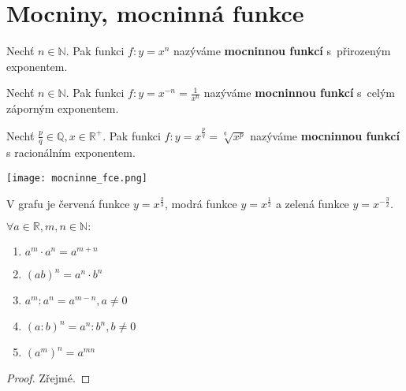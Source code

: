 \section{Mocniny, mocninná funkce}
\begin{minipage}{0.65\textwidth}
\begin{definition}
    Nechť $n\in \mathbb N.$ Pak funkci $f: y=x^n$ nazýváme \textbf{mocninnou funkcí}
    s~přirozeným exponentem.
\end{definition}

\begin{definition}
    Nechť $n\in \mathbb N.$ Pak funkci $f: y=x^{-n}=\frac{1}{x^n}$ nazýváme
    \textbf{mocninnou funkcí} s~celým záporným exponentem.
\end{definition}

\begin{definition}
    Nechť $\frac{p}{q}\in \mathbb Q, x \in \mathbb R^+.$ Pak funkci $f: y=
    x^{\frac{p}{q}}=\sqrt[q]{x^p}$ nazýváme \textbf{mocninnou funkcí}
    s racionálním exponentem.
\end{definition}
\end{minipage}
\hfill
\begin{minipage}{0.35\textwidth}
\vspace{-1em}\noindent\hfill\texttt{[image: mocninne\_fce.png]}
\end{minipage}

\begin{pozn}
    V grafu je červená funkce $y=x^\frac{2}{3}$, modrá funkce $y=x^\frac{1}{2}$ a
    zelená funkce $y=x^{-\frac{3}{2}}$.
\end{pozn}


\begin{veta}
    $\forall a \in \mathbb R, m,n \in \mathbb N:$
    \begin{enumerate}[$i.$]
        \item $a^m\cdot a^n=a^{m+n}$
       	\item $(ab)^n = a^n\cdot b^n$
       	\item $a^m : a^n = a^{m-n}, a \ne 0$
       	\item $(a : b)^n = a^n : b^n, b \ne 0$
       	\item $\left ( a^m \right )^n = a^{mn}$
    \end{enumerate}
\end{veta}

\begin{proof}
    Zřejmé.
\end{proof}

